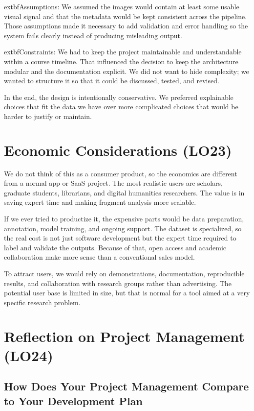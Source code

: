 \documentclass{article}
\begin{document}
	extbf{Assumptions:} We assumed the images would contain at least some usable
visual signal and that the metadata would be kept consistent across the pipeline.
Those assumptions made it necessary to add validation and error handling so the
system fails clearly instead of producing misleading output.

	extbf{Constraints:} We had to keep the project maintainable and understandable
within a course timeline. That influenced the decision to keep the architecture
modular and the documentation explicit. We did not want to hide complexity; we
wanted to structure it so that it could be discussed, tested, and revised.

In the end, the design is intentionally conservative. We preferred explainable
choices that fit the data we have over more complicated choices that would be
harder to justify or maintain.

\section{Economic Considerations (LO23)}

We do not think of this as a consumer product, so the economics are different
from a normal app or SaaS project. The most realistic users are scholars,
graduate students, librarians, and digital humanities researchers. The value is
in saving expert time and making fragment analysis more scalable.

If we ever tried to productize it, the expensive parts would be data preparation,
annotation, model training, and ongoing support. The dataset is specialized, so
the real cost is not just software development but the expert time required to
label and validate the outputs. Because of that, open access and academic
collaboration make more sense than a conventional sales model.

To attract users, we would rely on demonstrations, documentation, reproducible
results, and collaboration with research groups rather than advertising. The
potential user base is limited in size, but that is normal for a tool aimed at a
very specific research problem.

\section{Reflection on Project Management (LO24)}

\subsection{How Does Your Project Management Compare to Your Development Plan}
\end{document}
